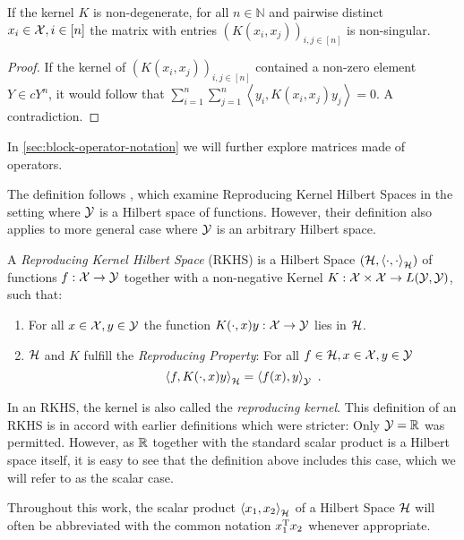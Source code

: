 \begin{lemma}
	\label{lem:kernel-non-singular}
	If the kernel $K$ is non-degenerate, for all $n \in \mathbb{N}$ and pairwise distinct $x_i \in \mathcal{X}, i \in [n]$ the matrix with entries $(K(x_i, x_j))_{i, j \in [n]}$ is non-singular.
\end{lemma}
\begin{proof}
	If the kernel of $(K(x_i, x_j))_{i, j \in [n]}$ contained a non-zero element $Y \in cY^n$, it would follow that $\sum_{i=1}^n \sum_{j=1}^n \left< y_i, K(x_i, x_j)  y_j\right> = 0$.
	A contradiction.
\end{proof}
In \cref{sec:block-operator-notation} we will further explore matrices made of operators.

The definition follows \citet{kadri16}, which examine Reproducing Kernel Hilbert Spaces in the setting where $\mathcal{Y}$ is a Hilbert space of functions.
However, their definition also applies to more general case where $\mathcal{Y}$ is an arbitrary Hilbert space.
\begin{definition}
	\label{def:rkhs}
	A \emph{Reproducing Kernel Hilbert Space} (RKHS) is a Hilbert Space $(\mathcal{H}, \left<\cdot, \cdot\right>_{\mathcal{H}})$ of functions $f: \mathcal{X} \rightarrow \mathcal{Y}$ together with a non-negative Kernel $K: \mathcal{X} \times \mathcal{X} \rightarrow L(\mathcal{Y}, \mathcal{Y})$, such that:
	\begin{enumerate}
		\item For all $x\in \mathcal{X}, y \in \mathcal{Y}$ the function $K(\cdot, x) y: \mathcal{X} \rightarrow \mathcal{Y}$ lies in $\mathcal{H}$.
		\item $\mathcal{H}$ and $K$ fulfill the \emph{Reproducing Property}: For all $f \in \mathcal{H}, x \in \mathcal{X}, y \in \mathcal{Y}$
		\begin{equation}
			\label{eq:reproducing-property}
			\left< f, K(\cdot, x) y \right>_{\mathcal{H}} = \left< f(x), y\right>_{\mathcal{Y}} \ .
		\end{equation}
	\end{enumerate}
\end{definition}

In an RKHS, the kernel is also called the \emph{reproducing kernel}.
This definition of an RKHS is in accord with earlier definitions \cite{berlinet04, sejdinovic12} which were stricter:
Only $\mathcal{Y} = \mathbb{R}$ was permitted.
However, as $\mathbb{R}$ together with the standard scalar product is a Hilbert space itself, it is easy to see that the definition above includes this case, which we will refer to as the scalar case.

Throughout this work, the scalar product $\left< x_1, x_2 \right>_{\mathcal{H}}$ of a Hilbert Space $\mathcal{H}$ will often be abbreviated with the common notation $x_1^{\mathrm{T}} x_2$ whenever appropriate.

